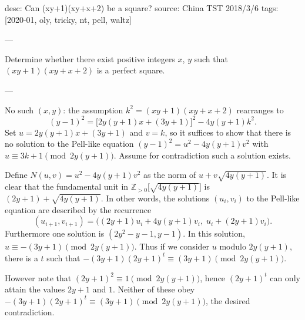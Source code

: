 desc: Can (xy+1)(xy+x+2) be a square?
source: China TST 2018/3/6
tags: [2020-01, oly, tricky, nt, pell, waltz]

---

Determine whether there exist positive integers $x$, $y$ such that $(xy+1)(xy+x+2)$ is a perfect square.

---

No such $(x,y)$: the assumption $k^2=(xy+1)(xy+x+2)$ rearranges to \[(y-1)^2=\big[2y(y+1)x+(3y+1)\big]^2-4y(y+1)k^2.\]
Set $u=2y(y+1)x+(3y+1)$ and $v=k$, so it suffices to show that there is no solution to the Pell-like equation $(y-1)^2=u^2-4y(y+1)v^2$ with $u\equiv3k+1\pmod{2y(y+1)}$. Assume for contradiction such a solution exists.

Define $N(u,v)=u^2-4y(y+1)v^2$ as the norm of $u+v\sqrt{4y(y+1)}$. It is clear that the fundamental unit in $\mathbb Z_{>0}\big[\sqrt{4y(y+1)}\big]$ is $(2y+1)+\sqrt{4y(y+1)}$. In other words, the solutions $(u_i,v_i)$ to the Pell-like equation are described by the recurrence \[(u_{i+1},v_{i+1})=\Big( (2y+1)u_i+4y(y+1)v_i,\;u_i+(2y+1)v_i\Big).\]
Furthermore one solution is $(2y^2-y-1,y-1)$. In this solution, $u\equiv-(3y+1)\pmod{2y(y+1)}$. Thus if we consider $u$ modulo $2y(y+1)$, there is a $t$ such that $-(3y+1)(2y+1)^t\equiv(3y+1)\pmod{2y(y+1)}$.

However note that $(2y+1)^2\equiv1\pmod{2y(y+1)}$, hence $(2y+1)^t$ can only attain the values $2y+1$ and $1$. Neither of these obey $-(3y+1)(2y+1)^t\equiv(3y+1)\pmod{2y(y+1)}$, the desired contradiction.
